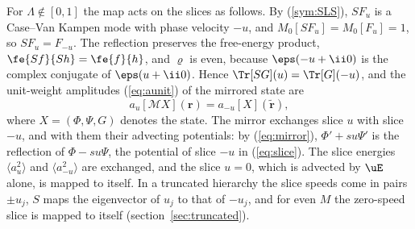 For $\Lambda\notin[0,1]$ the map acts on the slices as follows. By (\ref{sym:SLS}), $SF_u$ is a Case--Van Kampen mode with phase velocity $-u$, and $M_0[SF_u]=M_0[F_u]=1$, so $SF_u=F_{-u}$. The reflection preserves the free-energy product, $\fe{Sf}{Sh}=\fe{f}{h}$, and $\varrho$ is even, because $\eps(-u+\ii0)$ is the complex conjugate of $\eps(u+\ii0)$. Hence $\Tr[SG](u)=\Tr[G](-u)$, and the unit-weight amplitudes (\ref{eq:aunit}) of the mirrored state are
\begin{equation}\label{sym:slices}
  a_u[\mathcal MX](\boldsymbol r)=a_{-u}[X](\tilde{\boldsymbol r}),
\end{equation}
where $X=(\Phi,\Psi,G)$ denotes the state. The mirror exchanges slice $u$ with slice $-u$, and with them their advecting potentials: by (\ref{eq:mirror}), $\Phi'+su\Psi'$ is the reflection of $\Phi-su\Psi$, the potential of slice $-u$ in (\ref{eq:slice}). The slice energies $\langle a_u^2\rangle$ and $\langle a_{-u}^2\rangle$ are exchanged, and the slice $u=0$, which is advected by $\uE$ alone, is mapped to itself. In a truncated hierarchy the slice speeds come in pairs $\pm u_j$, $S$ maps the eigenvector of $u_j$ to that of $-u_j$, and for even $M$ the zero-speed slice is mapped to itself (section~\ref{sec:truncated}).

